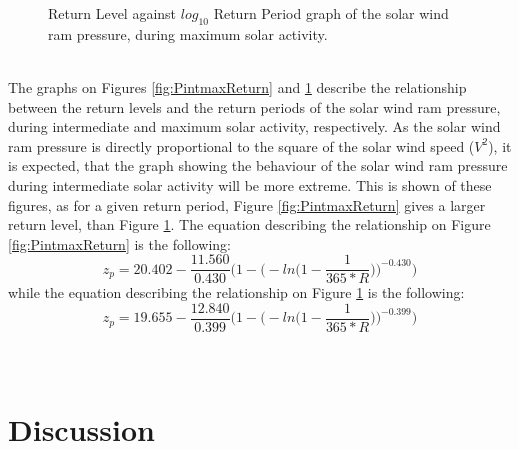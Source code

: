 \documentclass[12pt]{article}
\begin{document}
\begin{figure}[t!]
\begin{minipage}{0.48\textwidth}
                \caption{Return Level against $log_{10}$ Return Period graph of the solar wind ram pressure, during maximum solar activity.}
                \label{fig:PmaxmaxReturn}
            \end{minipage}
        \end{figure}\\
        The graphs on Figures \ref{fig:PintmaxReturn} and \ref{fig:PmaxmaxReturn} describe the relationship between the return levels and the return periods of the solar wind ram pressure, during intermediate and maximum solar activity, respectively. As the solar wind ram pressure is directly proportional to the square of the solar wind speed ($V^2$), it is expected, that the graph showing the behaviour of the solar wind ram pressure during intermediate solar activity will be more extreme. This is shown of these figures, as for a given return period, Figure \ref{fig:PintmaxReturn} gives a larger return level, than Figure \ref{fig:PmaxmaxReturn}. The equation describing the relationship on Figure \ref{fig:PintmaxReturn} is the following:
        \begin{equation}
            z_p =20.402-\frac{11.560}{0.430}\Bigg( 1-\Bigg( -ln\Bigg( 1-\frac{1}{365*R}\Bigg) \Bigg) ^{-0.430}\Bigg)
        \end{equation}
        while the equation describing the relationship on Figure \ref{fig:PmaxmaxReturn} is the following:
        \begin{equation}
            z_p = 19.655-\frac{12.840}{0.399}\Bigg( 1-\Bigg( -ln\Bigg( 1-\frac{1}{365*R}\Bigg) \Bigg) ^{-0.399}\Bigg)
        \end{equation}\\ \\
\section{Discussion}\label{sec:discussion}
\end{document}
